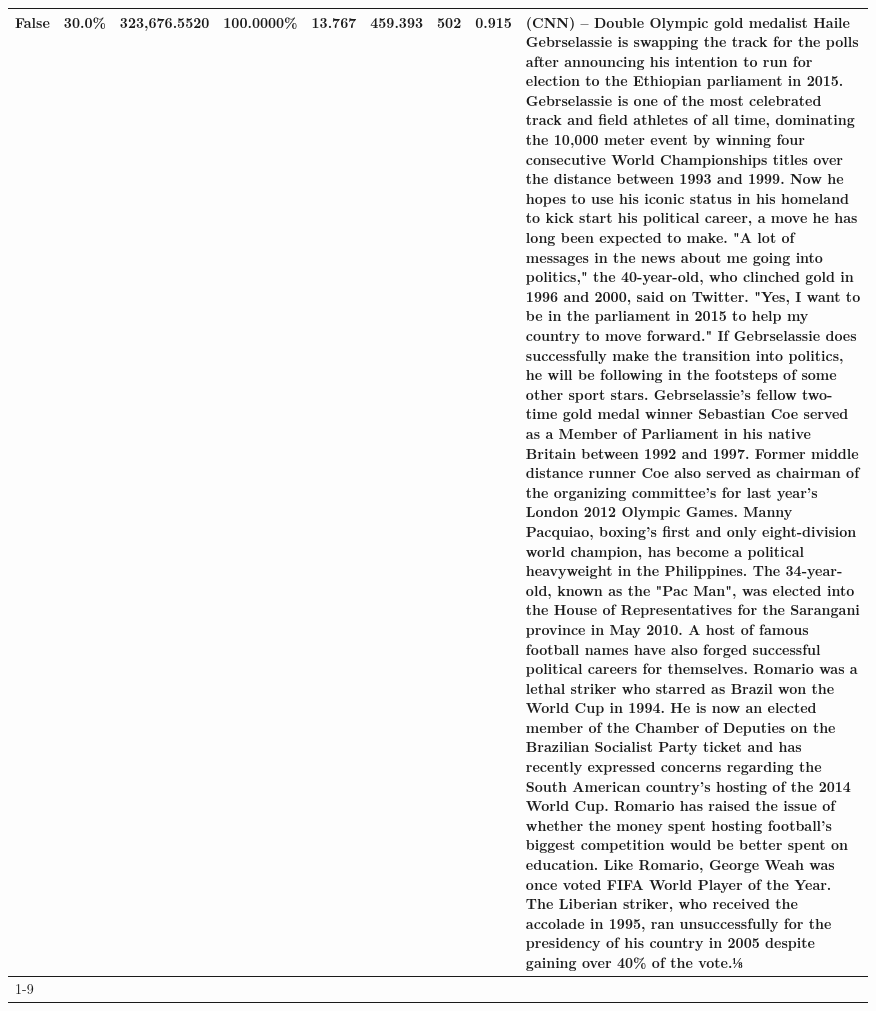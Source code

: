 \begin{table}[H]
{\begin{tabular}{lllrlllll}
False & 30.0\% & 323,676.5520 & \bfseries \color{red} 100.0000\% & 13.767 & 459.393 & 502 & 0.915 & (CNN) -- Double Olympic gold medalist Haile Gebrselassie is swapping the track for the polls after announcing his intention to run for election to the Ethiopian parliament in 2015. Gebrselassie is one of the most celebrated track and field athletes of all time, dominating the 10,000 meter event by winning four consecutive World Championships titles over the distance between 1993 and 1999. Now he hopes to use his iconic status in his homeland to kick start his political career, a move he has long been expected to make. "A lot of messages in the news about me going into politics," the 40-year-old, who clinched gold in 1996 and 2000, said on Twitter. "Yes, I want to be in the parliament in 2015 to help my country to move forward." If Gebrselassie does successfully make the transition into politics, he will be following in the footsteps of some other sport stars. Gebrselassie's fellow two-time gold medal winner Sebastian Coe served as a Member of Parliament in his native Britain between 1992 and 1997. Former middle distance runner Coe also served as chairman of the organizing committee's for last year's London 2012 Olympic Games. Manny Pacquiao, boxing's first and only eight-division world champion, has become a political heavyweight in the Philippines. The 34-year-old, known as the "Pac Man", was elected into the House of Representatives for the Sarangani province in May 2010. A host of famous football names have also forged successful political careers for themselves. Romario was a lethal striker who starred as Brazil won the World Cup in 1994. He is now an elected member of the Chamber of Deputies on the Brazilian Socialist Party ticket and has recently expressed concerns regarding the South American country's hosting of the 2014 World Cup. Romario has raised the issue of whether the money spent hosting football's biggest competition would be better spent on education. Like Romario, George Weah was once voted FIFA World Player of the Year. The Liberian striker, who received the accolade in 1995, ran unsuccessfully for the presidency of his country in 2005 despite gaining over 40\% of the vote.⅛ \\
\cline{1-9}

\end{tabular}}
\end{table}
